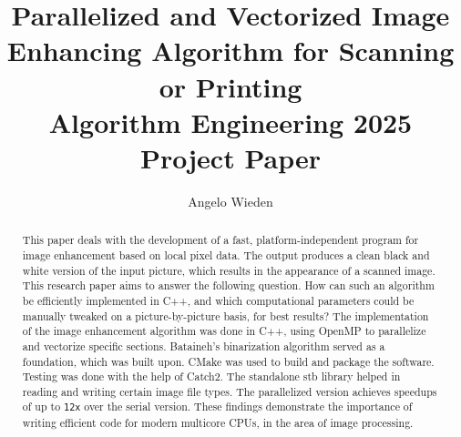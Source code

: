 \documentclass[sigconf]{acmart}
\begin{document}
\title[Parallelized and Vectorized Image Enhancing Algorithm for Scanning or Printing]{Parallelized and Vectorized Image Enhancing Algorithm for Scanning or Printing \\\large Algorithm Engineering 2025 Project Paper}


\author{Angelo Wieden}


\begin{abstract}


This paper deals with the development of a fast, platform-independent program for image enhancement based on local pixel data. The output produces a clean black and white version of the input picture, which results in the appearance of a scanned image. This research paper aims to answer the following question. How can such an algorithm be efficiently implemented in C++, and which computational parameters could be manually tweaked on a picture-by-picture basis, for best results? The implementation of the image enhancement algorithm was done in C++, using OpenMP to parallelize and vectorize specific sections. Bataineh's binarization algorithm served as a foundation, which was built upon. CMake was used to build and package the software. Testing was done with the help of Catch2. The standalone stb library helped in reading and writing certain image file types. The parallelized version achieves speedups of up to \texttt{12x} over the serial version. These findings demonstrate the importance of writing efficient code for modern multicore CPUs, in the area of image processing.



\end{abstract}



\maketitle
\end{document}

